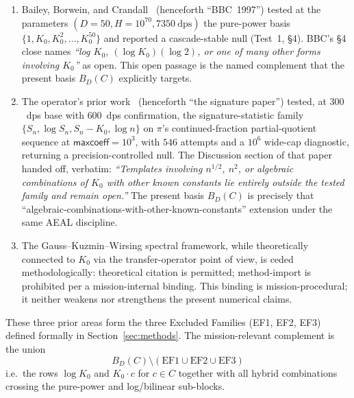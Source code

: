 \documentclass[11pt,a4paper]{article}
\newcommand{\K}{K_{0}}
\newcommand{\BDC}{B_{D}(C)}
\begin{document}
\begin{enumerate}[label=(\arabic*),itemsep=2pt,topsep=2pt]
\item Bailey, Borwein, and Crandall~\cite{bbc1997}
  (henceforth ``BBC~1997'') tested at the parameters
  $(D{=}50, H{=}10^{70}, 7350~\text{dps})$
  the pure-power basis $\{1, \K, \K^{2}, \ldots, \K^{50}\}$
  and reported a cascade-stable null (Test~1, \S 4).
  BBC's \S 4 close names
  \emph{``log $\K$, $(\log\K)(\log 2)$, or one of many other forms involving $\K$''}
  as open.
  This open passage is the named complement that the present basis
  $\BDC$ explicitly targets.

\item The operator's prior work~\cite{papanokechi2026signature}
  (henceforth ``the signature paper'') tested, at $300$~dps base with
  $600$~dps confirmation, the signature-statistic family
  $\{S_{n}, \log S_{n}, S_{n}-\K, \log n\}$ on $\pi$'s continued-fraction
  partial-quotient sequence at $\textsf{maxcoeff}=10^{3}$,
  with $546$ attempts and a $10^{6}$ wide-cap diagnostic, returning a
  precision-controlled null.
  The Discussion section of that paper handed off, verbatim:
  \emph{``Templates involving $n^{1/2}$, $n^{2}$, or algebraic combinations
  of $\K$ with other known constants lie entirely outside the tested
  family and remain open.''}
  The present basis $\BDC$ is precisely that
  ``algebraic-combinations-with-other-known-constants'' extension under the
  same AEAL discipline.

\item The Gauss--Kuzmin--Wirsing spectral framework, while theoretically
  connected to $\K$ via the transfer-operator point of view, is ceded
  methodologically: theoretical citation is permitted; method-import is
  prohibited per a mission-internal binding.
  This binding is mission-procedural; it neither weakens nor strengthens
  the present numerical claims.
\end{enumerate}

These three prior areas form the three Excluded Families (EF1, EF2, EF3)
defined formally in Section~\ref{sec:methods}.
The mission-relevant complement is the union
\begin{equation}\label{eq:complement}
  \BDC \setminus (\text{EF1} \cup \text{EF2} \cup \text{EF3})
\end{equation}
i.e.\ the rows $\log\K$ and $\K\cdot c$ for $c \in C$ together with all
hybrid combinations crossing the pure-power and log/bilinear sub-blocks.
\end{document}
